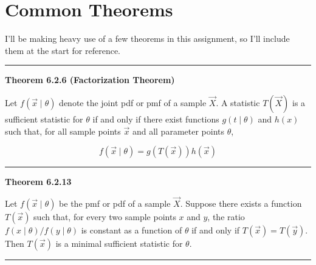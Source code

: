 \section*{Common Theorems}

I'll be making heavy use of a few theorems in this assignment, so I'll include them at the start for reference.


\vspace{5mm}
\hrule
\vspace{5mm}
\noindent\textbf{Theorem 6.2.6 (Factorization Theorem)}

Let $f(\vec{x} \mid \theta)$ denote the joint pdf or pmf of a sample $\vec{X}$. A statistic $T(\vec{X})$ is a sufficient statistic for $\theta$ if and only if there exist functions $g(t \mid \theta)$ and $h(x)$ such that, for all sample points $\vec{x}$ and all parameter points $\theta$,

\[f(\vec{x} \mid \theta) = g(T(\vec{x}))h(\vec{x})\]

\vspace{5mm}
\hrule
\vspace{5mm}

\noindent\textbf{Theorem 6.2.13}

Let $f(\vec{x} \mid \theta)$ be the pmf or pdf of a sample $\vec{X}$. Suppose there exists a function $T(\vec{x})$ such that, for every two sample points $x$ and $y$, the ratio $f(x \mid \theta) / f(y \mid \theta)$ is constant as a function of $\theta$ if and only if $T(\vec{x}) = T(\vec{y})$. Then $T(\vec{x})$ is a minimal sufficient statistic for $\theta$.

\vspace{5mm}
\hrule
\vspace{5mm}
